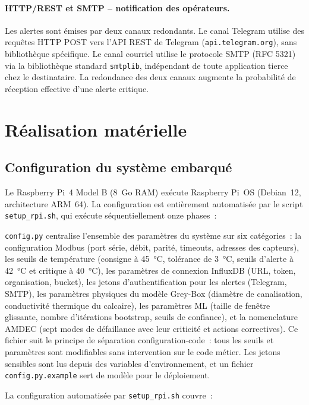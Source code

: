 \paragraph{HTTP/REST et SMTP -- notification des opérateurs.}
Les alertes sont émises par deux canaux redondants. Le canal Telegram utilise des requêtes HTTP POST vers l'API REST de Telegram (\texttt{api.telegram.org}), sans bibliothèque spécifique. Le canal courriel utilise le protocole SMTP (RFC 5321) via la bibliothèque standard \texttt{smtplib}, indépendant de toute application tierce chez le destinataire. La redondance des deux canaux augmente la probabilité de réception effective d'une alerte critique.

\section{Réalisation matérielle}

\subsection{Configuration du système embarqué}

Le Raspberry Pi~4 Model B (8~Go RAM) exécute Raspberry Pi~OS (Debian~12, architecture ARM~64). La configuration est entièrement automatisée par le script \texttt{setup\_rpi.sh}, qui exécute séquentiellement onze phases~:

\medskip
\noindent\texttt{config.py} centralise l'ensemble des paramètres du système sur six catégories~: la configuration Modbus (port série, débit, parité, timeouts, adresses des capteurs), les seuils de température (consigne à 45~\si{\celsius}, tolérance de 3~\si{\celsius}, seuils d'alerte à 42~\si{\celsius} et critique à 40~\si{\celsius}), les paramètres de connexion InfluxDB (URL, token, organisation, bucket), les jetons d'authentification pour les alertes (Telegram, SMTP), les paramètres physiques du modèle Grey-Box (diamètre de canalisation, conductivité thermique du calcaire), les paramètres ML (taille de fenêtre glissante, nombre d'itérations bootstrap, seuils de confiance), et la nomenclature AMDEC (sept modes de défaillance avec leur criticité et actions correctives). Ce fichier suit le principe de séparation configuration-code~: tous les seuils et paramètres sont modifiables sans intervention sur le code métier. Les jetons sensibles sont lus depuis des variables d'environnement, et un fichier \texttt{config.py.example} sert de modèle pour le déploiement.

La configuration automatisée par \texttt{setup\_rpi.sh} couvre~:

